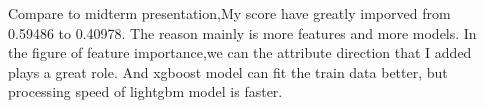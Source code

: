 \documentclass{tikzposter} %
\begin{document}
\begin{columns}
{%
%	
%			
%			
}


{
	Compare to midterm presentation,My score have greatly imporved from 0.59486 to 0.40978. The reason mainly is more features and more models. In the figure of feature	importance,we can the attribute direction that I added plays a great role. And xgboost model can fit the train data better, but processing speed of lightgbm model is faster.
}



\end{columns}
\end{document}
